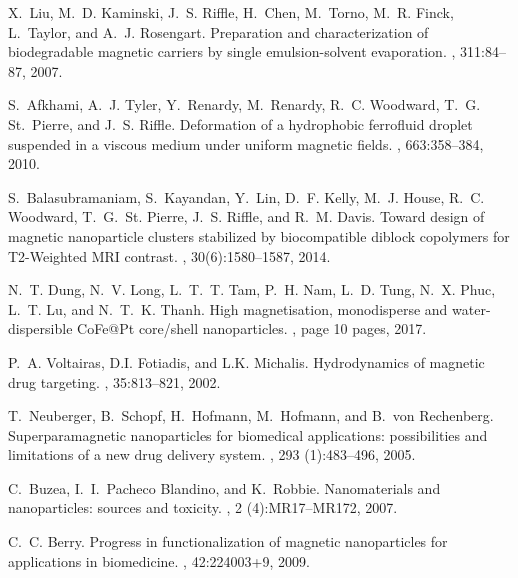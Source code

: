 \begin{thebibliography}{10}

X.~Liu, M.~D. Kaminski, J.~S. Riffle, H.~Chen, M.~Torno, M.~R. Finck,
  L.~Taylor, and A.~J. Rosengart.
\newblock Preparation and characterization of biodegradable magnetic carriers
  by single emulsion-solvent evaporation.
, 311:84--87, 2007.

S.~Afkhami, A.~J. Tyler, Y.~Renardy, M.~Renardy, R.~C. Woodward, T.~G.
  {St.~Pierre}, and J.~S. Riffle.
\newblock Deformation of a hydrophobic ferrofluid droplet suspended in a
  viscous medium under uniform magnetic fields.
, 663:358--384, 2010.

S.~Balasubramaniam, S.~Kayandan, Y.~Lin, D.~F. Kelly, M.~J. House, R.~C.
  Woodward, T.~G.~St. Pierre, J.~S. Riffle, and R.~M. Davis.
\newblock Toward design of magnetic nanoparticle clusters stabilized by
  biocompatible diblock copolymers for {T2-Weighted} {MRI} contrast.
, 30(6):1580--1587, 2014.

N.~T. Dung, N.~V. Long, L.~T.~T. Tam, P.~H. Nam, L.~D. Tung, N.~X. Phuc, L.~T.
  Lu, and N.~T.~K. Thanh.
\newblock High magnetisation{,} monodisperse and water-dispersible {CoFe@Pt}
  core/shell nanoparticles.
, page 10 pages, 2017.

P.~A. Voltairas, D.I. Fotiadis, and L.K. Michalis.
\newblock Hydrodynamics of magnetic drug targeting.
, 35:813--821, 2002.

T.~Neuberger, B.~Schopf, H.~Hofmann, M.~Hofmann, and B.~von Rechenberg.
\newblock Superparamagnetic nanoparticles for biomedical applications:
  possibilities and limitations of a new drug delivery system.
, 293 (1):483--496, 2005.

C.~Buzea, I.~I.~Pacheco Blandino, and K.~Robbie.
\newblock Nanomaterials and nanoparticles: sources and toxicity.
, 2 (4):MR17--MR172, 2007.

C.~C. Berry.
\newblock Progress in functionalization of magnetic nanoparticles for
  applications in biomedicine.
, 42:224003+9, 2009.


\end{thebibliography}
